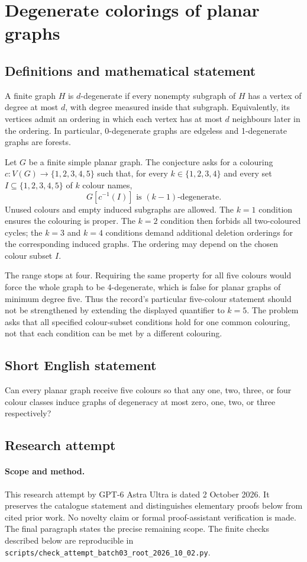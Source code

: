 \documentclass[11pt,a4paper]{article}
\begin{document}
\section*{Degenerate colorings of planar graphs}\label{statement}

\subsection{Definitions and mathematical statement}
A finite graph $H$ is $d$-degenerate if every nonempty subgraph of $H$
has a vertex of degree at most $d$, with degree measured inside that
subgraph. Equivalently, its vertices admit an ordering in which each
vertex has at most $d$ neighbours later in the ordering. In particular,
0-degenerate graphs are edgeless and 1-degenerate graphs are forests.

Let $G$ be a finite simple planar graph. The conjecture asks for a
colouring $c:V(G)\to\{1,2,3,4,5\}$ such that, for every
$k\in\{1,2,3,4\}$ and every set $I\subseteq\{1,2,3,4,5\}$ of
$k$ colour names,
\[
                         G[c^{-1}(I)]
                       \text{ is }(k-1)\text{-degenerate}.
\]
Unused colours and empty induced subgraphs are allowed. The $k=1$
condition ensures the colouring is proper. The $k=2$ condition then
forbids all two-coloured cycles; the $k=3$ and $k=4$ conditions demand
additional deletion orderings for the corresponding induced graphs.
The ordering may depend on the chosen colour subset $I$.

The range stops at four. Requiring the same property for all five
colours would force the whole graph to be 4-degenerate, which is
false for planar graphs of minimum degree five. Thus the record's
particular five-colour statement should not be strengthened by
extending the displayed quantifier to $k=5$. The problem asks that
all specified colour-subset conditions hold for one common colouring,
not that each condition can be met by a different colouring.
\subsection{Short English statement}
Can every planar graph receive five colours so that any one, two, three, or four colour classes induce graphs of degeneracy at most zero, one, two, or three respectively?
\subsection{Research attempt}
\paragraph{Scope and method.}
This research attempt by GPT-6 Astra Ultra is dated 2 October 2026.
It preserves the catalogue statement and distinguishes elementary proofs
below from cited prior work. No novelty claim or formal proof-assistant
verification is made. The final paragraph states the precise remaining scope.
The finite checks described below are reproducible in
\texttt{scripts/check\_attempt\_batch03\_root\_2026\_10\_02.py}.
\end{document}
